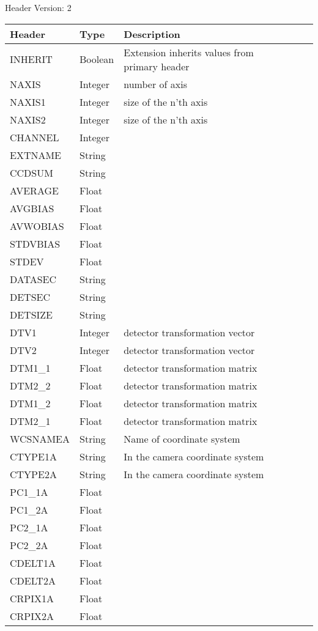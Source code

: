 Header Version: 2


\begin{longtable}{l l l l l}

\hline
Header & Type & Description \\
\hline
INHERIT & Boolean & Extension inherits values from primary header \\
NAXIS & Integer & number of axis \\
NAXIS1 & Integer & size of the n'th axis \\
NAXIS2 & Integer & size of the n'th axis \\
CHANNEL & Integer &  \\
EXTNAME & String &  \\
CCDSUM & String &  \\
AVERAGE & Float &  \\
AVGBIAS & Float &  \\
AVWOBIAS & Float &  \\
STDVBIAS & Float &  \\
STDEV & Float &  \\
DATASEC & String &  \\
DETSEC & String &  \\
DETSIZE & String &  \\
DTV1 & Integer & detector transformation vector \\
DTV2 & Integer & detector transformation vector \\
DTM1\_1 & Float & detector transformation matrix \\
DTM2\_2 & Float & detector transformation matrix \\
DTM1\_2 & Float & detector transformation matrix \\
DTM2\_1 & Float & detector transformation matrix \\
WCSNAMEA & String & Name of coordinate system \\
CTYPE1A & String & In the camera coordinate system \\
CTYPE2A & String & In the camera coordinate system \\
PC1\_1A & Float &  \\
PC1\_2A & Float &  \\
PC2\_1A & Float &  \\
PC2\_2A & Float &  \\
CDELT1A & Float &  \\
CDELT2A & Float &  \\
CRPIX1A & Float &  \\
CRPIX2A & Float &  \\

\end{longtable}
